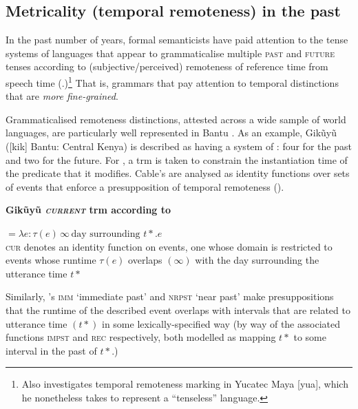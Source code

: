 \subsection{Metricality (temporal remoteness) in the past}\label{metr-sec}

In the past number of years, formal semanticists have paid attention to the tense systems of languages that appear to grammaticalise multiple \textsc{past} and \textsc{future} tenses according to (subjective/perceived) remoteness of reference time from speech time (\citealp[\textit{e.g.},][]{Cable2013,Klecha2016,Hayashi2015}.)\footnote{Also \citealp{Bohnemeyer2018} investigates temporal remoteness marking in Yucatec Maya [\gls{yua}], which he nonetheless takes to represent a ``tenseless'' language.} That is, grammars that pay attention to temporal distinctions that are \textit{more fine-grained}.

Grammaticalised remoteness distinctions, attested across a wide sample of world languages, are particularly well represented in Bantu \citep{Dahl1983,Botne2012}. As an example, Gikũyũ ([\gls{kik}] Bantu: Central Kenya) is described as having a system of : four for the past and two for the future. For \citet{Cable2013}, a \acrshort{trm} is taken to constrain the instantiation time of the predicate that it modifies. Cable's  are analysed as identity functions over sets of events that enforce a presupposition of temporal remoteness (\nextx).

\pex \textbf{Gikũyũ \textsc{\textit{current}} \acrlong{trm} according to \citet{Cable2013}}


$ =\lambda e:\tau(e)\,\infty\,\text{day surrounding }t\!*\mathbin{.}e $\\
\textsc{cur} denotes an identity function on events, one whose domain is restricted to events whose runtime $ \tau(e) $ overlaps $ (\infty) $ with the day surrounding the utterance time $ t* $
\xe

Similarly, \citeauthor{Cable2013}'s \textsc{imm} `immediate past' and \textsc{nrpst} `near past' make presuppositions that the runtime of the described event overlaps with intervals that are related to utterance time $ (t*) $ in some lexically-specified way (by way of the associated functions \textsf{\textsc{impst}} and \textsf{\textsc{rec}} respectively, both modelled as mapping $ t* $ to some interval in the past of $ t* $.)



